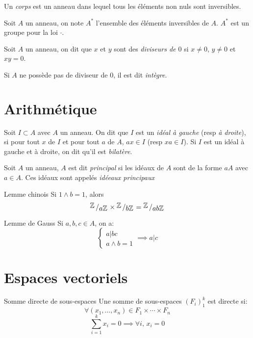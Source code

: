 \documentclass[french, a4paper, 11pt, twocolumn]{article}
\newcommand{\bigslant}[2]{{\raisebox{.2em}{$#1$}\left/\raisebox{-.2em}{$#2$}\right.}}
\newcommand{\Z}{\mathbb{Z}}   %
\begin{document}
\begin{definition}
  Un \emph{corps} est un anneau dans lequel tous les éléments non nuls sont inversibles.

  Soit $A$ un anneau, on note $A^{*}$ l'ensemble des éléments inversibles de $A$. $A^{*}$ est un groupe pour la loi $\cdot$.
\end{definition}

\begin{definition}
  Soit $A$ un anneau, on dit que $x$ et $y$ sont des \emph{diviseurs de $0$} si $x\neq 0$, $y\neq 0$ et $xy=0$.

  Si $A$ ne possède pas de diviseur de $0$, il est dit \emph{intègre}.
\end{definition}

\section{Arithmétique}
\begin{definition}
  Soit $I\subset A$ avec $A$ un anneau. On dit que $I$ est un \emph{idéal à gauche} (resp \emph{à droite}), si pour tout $x$ de $I$ et pour tout $a$ de $A$, $ax\in I$ (resp $xa \in I$). Si $I$ est un idéal à gauche et à droite, on dit qu'il est \emph{bilatère}.
\end{definition}

\begin{definition}
  Soit $A$ un anneau, $A$ est dit \emph{principal} si les idéaux de $A$ sont de la forme $aA$ avec $a\in A$. Ces idéaux sont appelés \emph{idéeaux principaux}
\end{definition}

\begin{theoreme}{Lemme chinois}
  Si $1\wedge b = 1$, alors
  \[\bigslant{\Z}{a\Z}\times\bigslant{\Z}{b\Z} = \bigslant{\Z}{ab\Z}\]
\end{theoreme}

\begin{theoreme}{Lemme de Gauss}
  Si $a,b,c\in A$, on a:
  \[\begin{cases}
      a|bc\\
      a\wedge b = 1
    \end{cases}\implies a|c\]
\end{theoreme}

\section{Espaces vectoriels}
\begin{theoreme}{Somme directe de sous-espaces}
  Une somme de sous-espaces $(F_{i})_{1}^{k}$ est directe si:
  \[\forall (x_{1},\ldots,x_{n}) \in F_{1}\times \cdots\times F_{n}\]
  \[\sum_{i=1}^k x_{i} = 0 \implies \forall i,\, x_{i}=0\]
\end{theoreme}
\end{document}
